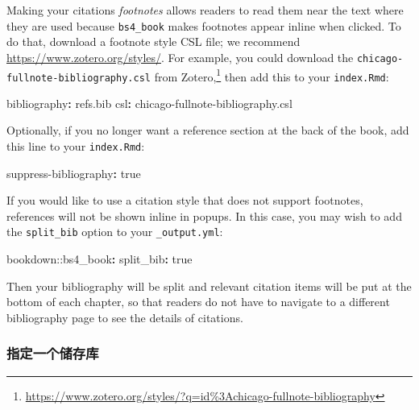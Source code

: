 \documentclass[
  12pt,
]{krantz}
\newenvironment{Shaded}{\begin{snugshade}}{\end{snugshade}}
\newcommand{\AttributeTok}[1]{\textcolor[rgb]{0.77,0.63,0.00}{#1}}
\newcommand{\CharTok}[1]{\textcolor[rgb]{0.31,0.60,0.02}{#1}}
\newcommand{\FunctionTok}[1]{\textcolor[rgb]{0.00,0.00,0.00}{#1}}
\newcommand{\KeywordTok}[1]{\textcolor[rgb]{0.13,0.29,0.53}{\textbf{#1}}}
\renewcommand{\href}[2]{#2\footnote{\url{#1}}}
\theoremstyle{definition}
\theoremstyle{definition}
\theoremstyle{definition}
\theoremstyle{definition}
\theoremstyle{remark}
\begin{document}
Making your citations \emph{footnotes} allows readers to read them near the text where they are used because \texttt{bs4\_book} makes footnotes appear inline when clicked.
To do that, download a footnote style CSL file; we recommend \url{https://www.zotero.org/styles/}.
For example, you could download the \texttt{chicago-fullnote-bibliography.csl} from \href{https://www.zotero.org/styles/?q=id\%3Achicago-fullnote-bibliography}{Zotero,} then
add this to your \texttt{index.Rmd}:

\begin{Shaded}
\begin{Highlighting}[]
\FunctionTok{bibliography}\KeywordTok{:}\AttributeTok{ refs.bib}
\FunctionTok{csl}\KeywordTok{:}\AttributeTok{ chicago{-}fullnote{-}bibliography.csl}
\end{Highlighting}
\end{Shaded}

Optionally, if you no longer want a reference section
at the back of the book, add this line to your \texttt{index.Rmd}:

\begin{Shaded}
\begin{Highlighting}[]
\FunctionTok{suppress{-}bibliography}\KeywordTok{:}\AttributeTok{ }\CharTok{true}
\end{Highlighting}
\end{Shaded}

If you would like to use a citation style that does not support footnotes, references will not be shown inline in popups. In this case, you may wish to add the \texttt{split\_bib} option to your \texttt{\_output.yml}:

\begin{Shaded}
\begin{Highlighting}[]
\AttributeTok{bookdown:}\FunctionTok{:bs4\_book}\KeywordTok{:}
\AttributeTok{  }\FunctionTok{split\_bib}\KeywordTok{:}\AttributeTok{ }\CharTok{true}
\end{Highlighting}
\end{Shaded}

Then your bibliography will be split and relevant citation items will be put at the bottom of each chapter, so that readers do not have to navigate to a different bibliography page to see the details of citations.

\hypertarget{ux6307ux5b9aux4e00ux4e2aux50a8ux5b58ux5e93}{%
\subsubsection{指定一个储存库}\label{ux6307ux5b9aux4e00ux4e2aux50a8ux5b58ux5e93}}
\end{document}
